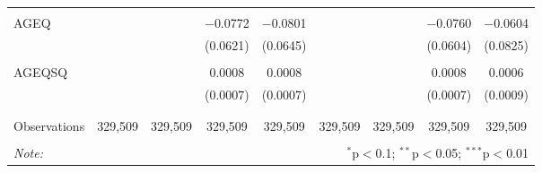 \documentclass{article}
\begin{document}
\begin{sidewaystable}[!htbp]
\begin{tabular}{@{\extracolsep{5pt}}lcccccccc}
  & & & & & & & & \\ 
 AGEQ &  &  & $-$0.0772 & $-$0.0801 &  &  & $-$0.0760 & $-$0.0604 \\ 
  &  &  & (0.0621) & (0.0645) &  &  & (0.0604) & (0.0825) \\ 
  & & & & & & & & \\ 
 AGEQSQ &  &  & 0.0008 & 0.0008 &  &  & 0.0008 & 0.0006 \\ 
  &  &  & (0.0007) & (0.0007) &  &  & (0.0007) & (0.0009) \\ 
  & & & & & & & & \\ 
\hline \\[-1.8ex] 
Observations & 329,509 & 329,509 & 329,509 & 329,509 & 329,509 & 329,509 & 329,509 & 329,509 \\ 
\hline 
\hline \\[-1.8ex] 
\textit{Note:}  & \multicolumn{8}{r}{$^{*}$p$<$0.1; $^{**}$p$<$0.05; $^{***}$p$<$0.01} \\ 
\end{tabular} 
\end{sidewaystable} 
\end{document}
